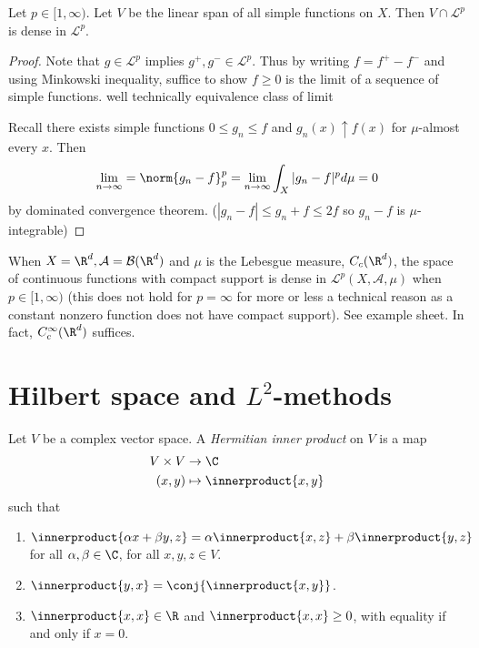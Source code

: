 \documentclass[a4paper]{article}
\newcommand*{\ip}{\innerproduct} %
\begin{document}
\begin{proposition}
  Let \(p \in [1, \infty)\). Let \(V\) be the linear span of all simple functions on \(X\). Then \(V \cap \mathcal L^p\) is dense in \(\mathcal L^p\).
\end{proposition}

\begin{proof}
  Note that \(g \in \mathcal L^p\) implies \(g^+, g^- \in \mathcal L^p\). Thus by writing \(f = f^+ - f^-\) and using Minkowski inequality, suffice to show \(f \geq 0\) is the limit of a sequence of simple functions. well technically equivalence class of limit

  Recall there exists simple functions \(0 \leq g_n \leq f\) and \(g_n(x) \uparrow f(x)\) for \(\mu\)-almost every \(x\). Then
  \[
    \lim_{n \to \infty} = \norm{g_n - f}_p^p = \lim_{n \to \infty} \int_X |g_n - f|^p d\mu = 0
  \]
  by dominated convergence theorem. (\(|g_n - f| \leq g_n + f \leq 2f\) so \(g_n - f\) is \(\mu\)-integrable)
\end{proof}

\begin{remark}
  When \(X = \R^d, \mathcal A = \mathcal B(\R^d)\) and \(\mu\) is the Lebesgue measure, \(C_c(\R^d)\), the space of continuous functions with compact support is dense in \(\mathcal L^p(X, \mathcal A, \mu)\) when \(p \in [1, \infty)\) (this does not hold for \(p = \infty\) for more or less a technical reason as a constant nonzero function does not have compact support). See example sheet. In fact, \(C_c^\infty(\R^d)\) suffices.
\end{remark}

\section{Hilbert space and \(L^2\)-methods}

\begin{definition}
  Let \(V\) be a complex vector space. A \emph{Hermitian inner product} on \(V\) is a map
  \begin{align*}
    V \times V &\to \C \\
    (x, y) &\mapsto \ip{x, y}
  \end{align*}
  such that
  \begin{enumerate}
  \item \(\ip{\alpha x + \beta y, z} = \alpha \ip{x, z} + \beta \ip{y, z}\) for all \(\alpha, \beta \in \C\), for all \(x, y, z \in V\).
  \item \(\ip{y, x} = \conj{\ip{x, y}}\).
  \item \(\ip{x, x} \in \R\) and \(\ip{x, x} \geq 0\), with equality if and only if \(x = 0\).
  \end{enumerate}
\end{definition}
\end{document}
